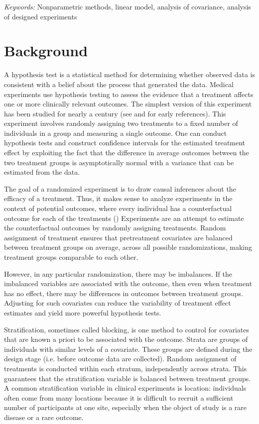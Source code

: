 \documentclass[12pt]{article}
\begin{document}
\noindent%
{\it Keywords:}  Nonparametric methods, linear model, analysis of covariance, analysis of designed experiments
\vfill

\newpage
{} %
\section{Background}
A hypothesis test is a statistical method for determining whether observed data is consistent with a belief about the process that generated the data.
Medical experiments use hypothesis testing to assess the evidence that a treatment affects one or more clinically relevant outcomes.
The simplest version of this experiment has been studied for nearly a century (see \cite{fisher_design_1935} and \cite[1990 translation]{neyman_application_1923} for early references).
This experiment involves randomly assigning two treatments to a fixed number of individuals in a group and measuring a single outcome.
One can conduct hypothesis tests and construct confidence intervals for the estimated treatment effect
by exploiting the fact that the difference in average outcomes between the two treatment groups is asymptotically normal with a variance that can be estimated from the data.

The goal of a randomized experiment is to draw causal inferences about the efficacy of a treatment.
Thus, it makes sense to analyze experiments in the context of potential outcomes, where every individual has a counterfactual outcome for each of the treatments (\cite{holland_1986_statistics})
Experiments are an attempt to estimate the counterfactual outcomes by randomly assigning treatments.
Random assignment of treatment ensures that pretreatment covariates are balanced between treatment groups on average, across all possible randomizations, making treatment groups comparable to each other.

However, in any particular randomization, there may be imbalances.
If the imbalanced variables are associated with the outcome, then even when treatment has no effect, there may be differences in outcomes between treatment groups.
Adjusting for such covariates can reduce the variability of treatment effect estimates and yield more powerful hypothesis tests.

Stratification, sometimes called blocking, is one method to control for covariates that are known a priori to be associated with the outcome.
Strata are groups of individuals with similar levels of a covariate.
These groups are defined during the design stage (i.e. before outcome data are collected).
Random assignment of treatments is conducted within each stratum, independently across strata.
This guarantees that the stratification variable is balanced between treatment groups.
A common stratification variable in clinical experiments is location:
individuals often come from many locations because it is difficult to recruit a sufficient number of participants at one site,
especially when the object of study is a rare disease or a rare outcome.
\end{document}
